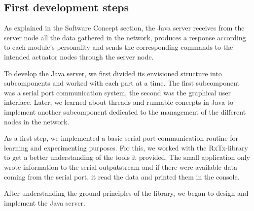 \subsection{First development steps}
As explained in the Software Concept section, the Java server receives from the server node all the data gathered in the network, produces a response according to each module’s personality and sends the corresponding commands to the intended actuator nodes through the server node.

To develop the Java server, we first divided its envisioned structure into subcomponents and worked with each part at a time. The first subcomponent was a serial port communication system, the second was the graphical user interface. Later, we learned about threads and runnable concepts in Java to implement another subcomponent dedicated to the management of the different nodes in the network. 

As a first step, we implemented a basic serial port communication routine for learning and experimenting purposes. For this, we worked with the RxTx-library to get a better understanding of the tools it provided. The small application only wrote information to the serial outputstream and if there were available data coming from the serial port, it read the data and printed them in the console.

After understanding the ground principles of the library, we began to design and implement the Java server.


